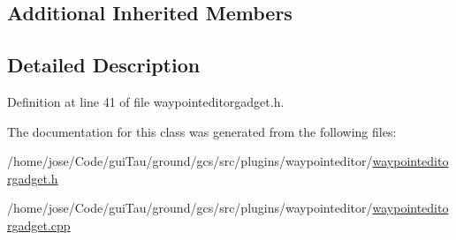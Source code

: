 \subsection*{Additional Inherited Members}


\subsection{Detailed Description}


Definition at line 41 of file waypointeditorgadget.\-h.



The documentation for this class was generated from the following files\-:\begin{DoxyCompactItemize}
\item 
/home/jose/\-Code/gui\-Tau/ground/gcs/src/plugins/waypointeditor/\hyperlink{waypointeditorgadget_8h}{waypointeditorgadget.\-h}\item 
/home/jose/\-Code/gui\-Tau/ground/gcs/src/plugins/waypointeditor/\hyperlink{waypointeditorgadget_8cpp}{waypointeditorgadget.\-cpp}\end{DoxyCompactItemize}
